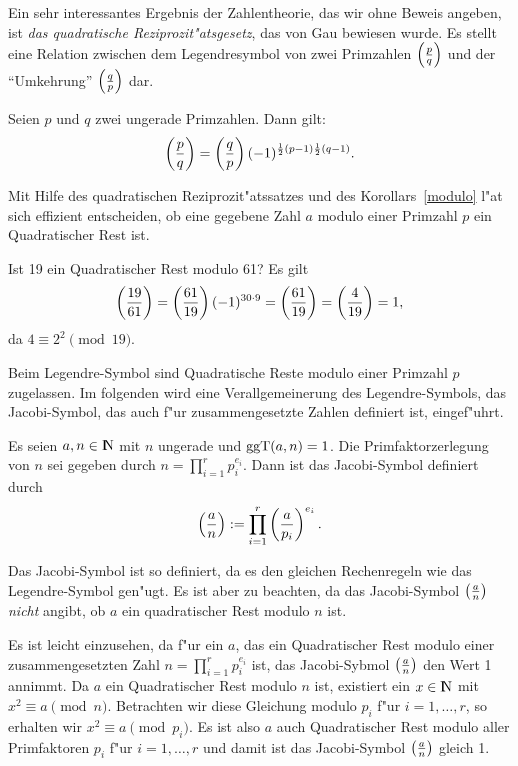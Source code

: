 Ein sehr interessantes Ergebnis der Zahlentheorie, das wir ohne Beweis
angeben, ist {\em das quadratische Reziprozit"atsgesetz}, das von
Gau\3 bewiesen wurde. Es stellt eine Relation zwischen dem
Legendresymbol von zwei Primzahlen $\left(\frac{p}{q}\right)$ und der "`Umkehrung"'
$\left(\frac{q}{p}\right)$ dar.

\begin{satz} 
Seien $p$ und $q$ zwei ungerade Primzahlen. Dann gilt:
  \begin{equation}
    \left(\frac{p}{q}\right) = \left(\frac{q}{p}\right) (-1)^{{1 \over 2}(p-1){1 \over 2}(q-1)} .
  \end{equation}
\end{satz}

Mit Hilfe des quadratischen Reziprozit"atssatzes und des
Korollars~\ref{modulo} l"a\3t sich effizient entscheiden, ob eine
gegebene Zahl $a$ modulo einer Primzahl $p$ ein Quadratischer Rest ist.

\begin{beispiel} Ist 19 ein Quadratischer Rest modulo 61? Es gilt
$$\left(\frac{19}{61}\right)=\left(\frac{61}{19}\right)(-1)^{30 \cdot 9}=\left(\frac{61}{19}\right)=\left(\frac{4}{19}\right) = 1, $$
da $4 \equiv 2^2 \pmod{19}$.
\end{beispiel}

Beim Legendre-Symbol sind Quadratische Reste modulo einer Primzahl $p$
zugelassen. Im folgenden wird eine Verallgemeinerung des
Legendre-Symbols, das Jacobi-Symbol, das auch f"ur zusammengesetzte
Zahlen definiert ist, eingef"uhrt.

\begin{definition}
  Es seien $a,n\in\N$ mit $n$ ungerade und $\mbox{ggT}(a,n)=1$. Die
  Primfaktorzerlegung von $n$ sei gegeben durch $n=\prod_{i=1}^{r}
  p_i^{e_i}$. Dann ist das Jacobi-Symbol definiert durch
  $$\left(\frac{a}{n}\right) := \prod_{i=1}^{r} \left(\frac{a}{p_i}\right)^{e_i} .$$
\end{definition}

Das Jacobi-Symbol ist so definiert, da\3 es den gleichen Rechenregeln
wie das Legendre-Symbol gen"ugt. Es ist aber zu beachten, da\3 das
Jacobi-Symbol $\left(\frac{a}{n}\right)$ {\em nicht} angibt, ob $a$ ein
quadratischer Rest modulo $n$ ist.

Es ist leicht einzusehen, da\3 f"ur ein $a$, das ein Quadratischer
Rest modulo einer zusammengesetzten Zahl $n=\prod_{i=1}^{r}p_i^{e_i}$
ist, das Jacobi-Sybmol $\left(\frac{a}{n}\right)$ den Wert 1 annimmt. Da $a$ ein
Quadratischer Rest modulo $n$ ist, existiert ein $x\in\N$ mit $x^2
\equiv a \pmod{n}$. Betrachten wir diese Gleichung modulo $p_i$ f"ur
$i=1,\ldots,r$, so erhalten wir $ x^2 \equiv a \pmod{p_i}$. Es ist
also $a$ auch Quadratischer Rest modulo aller Primfaktoren $p_i$ 
f"ur $i=1,\ldots,r$ und damit ist das Jacobi-Symbol $\left(\frac{a}{n}\right)$ 
gleich 1.

